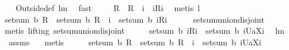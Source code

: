 \begin{isabellebody}
\ \ \isamarkupfalse%
\ Outside{\isacharunderscore}def\ lm{}{}\ \isamarkupfalse%
\ fast\ \isanewline
\ \ \isamarkupfalse%
\ {\isachardoublequoteopen}{\isacharquery}R\ {\isacharequal}\ {\isacharparenleft}{\isacharquery}R\ {\isacharminus}{\isacharminus}\ i{\isacharparenright}\ {\isasymunion}\ {\isacharparenleft}{\isacharbraceleft}i{\isacharbraceright}{\isasymtimes}{\isacharquery}R{\isacharbackquote}{\isacharbackquote}{\isacharbraceleft}i{\isacharbraceright}{\isacharparenright}{\isachardoublequoteclose}\ \isamarkupfalse%
\ {\isacharparenleft}metis\ l{}{}{\isacharparenright}\isanewline
\ \ \isamarkupfalse%
\ \isamarkupfalse%
\ {\isachardoublequoteopen}setsum\ b\ {\isacharquery}R\ {\isacharequal}\ setsum\ b\ {\isacharparenleft}{\isacharquery}R\ {\isacharminus}{\isacharminus}\ i{\isacharparenright}\ {\isacharplus}\ setsum\ b\ {\isacharparenleft}{\isacharbraceleft}i{\isacharbraceright}{\isasymtimes}{\isacharparenleft}{\isacharquery}R{\isacharbackquote}{\isacharbackquote}{\isacharbraceleft}i{\isacharbraceright}{\isacharparenright}{\isacharparenright}{\isachardoublequoteclose}\ \isanewline
\ \ \isamarkupfalse%
\ {}\ setsum{\isachardot}union{\isacharunderscore}disjoint\ \isamarkupfalse%
\ {\isacharparenleft}metis\ {\isacharparenleft}lifting{\isacharparenright}\ setsum{\isachardot}union{\isacharunderscore}disjoint{\isacharparenright}\isanewline
\ \ \isamarkupfalse%
\ \isamarkupfalse%
\ {\isachardoublequoteopen}setsum\ b\ {\isacharparenleft}{\isacharbraceleft}i{\isacharbraceright}{\isasymtimes}{\isacharparenleft}{\isacharquery}R{\isacharbackquote}{\isacharbackquote}{\isacharbraceleft}i{\isacharbraceright}{\isacharparenright}{\isacharparenright}\ {\isasymle}\ setsum\ b\ {\isacharparenleft}{\isacharbraceleft}i{\isacharbraceright}{\isasymtimes}{\isacharbraceleft}{\isacharquery}U{\isacharparenleft}a{\isacharbackquote}{\isacharbackquote}{\isacharparenleft}X{\isasymunion}{\isacharbraceleft}i{\isacharbraceright}{\isacharparenright}{\isacharparenright}{\isacharbraceright}{\isacharparenright}{\isachardoublequoteclose}\ \isamarkupfalse%
\ lm{}{}\ \isanewline
\ \ assms{\isacharparenleft}{}{\isacharparenright}\ {}\ \isamarkupfalse%
\ metis\isanewline
\ \ \isamarkupfalse%
\ \isamarkupfalse%
\ {\isachardoublequoteopen}setsum\ b\ {\isacharquery}R\ {\isasymle}\ setsum\ b\ {\isacharparenleft}{\isacharquery}R\ {\isacharminus}{\isacharminus}\ i{\isacharparenright}\ {\isacharplus}\ setsum\ b\ {\isacharparenleft}{\isacharbraceleft}i{\isacharbraceright}{\isasymtimes}{\isacharbraceleft}{\isacharquery}U{\isacharparenleft}a{\isacharbackquote}{\isacharbackquote}{\isacharparenleft}X{\isasymunion}{\isacharbraceleft}i{\isacharbraceright}{\isacharparenright}{\isacharparenright}{\isacharbraceright}{\isacharparenright}{\isachardoublequoteclose}\ \isamarkupfalse%

\end{isabellebody}
